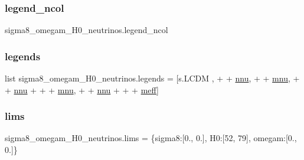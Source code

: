 \subsubsection{\texorpdfstring{legend\+\_\+ncol}{legend\_ncol}}
{\footnotesize\ttfamily sigma8\+\_\+omegam\+\_\+\+H0\+\_\+neutrinos.\+legend\+\_\+ncol}

\mbox{\label{namespacesigma8__omegam__H0__neutrinos_aea361e871a0ef6fe21cd7907ba18a4e9}} 
\subsubsection{\texorpdfstring{legends}{legends}}
{\footnotesize\ttfamily list sigma8\+\_\+omegam\+\_\+\+H0\+\_\+neutrinos.\+legends = \mbox{[}s.\+L\+C\+DM , \textquotesingle{}+\textquotesingle{} + \mbox{\hyperlink{namespacesigma8__omegam__H0__neutrinos_acb935efeda9daade15f08c15a961ef21}{nnu}}, \textquotesingle{}+\textquotesingle{} + \mbox{\hyperlink{namespacesigma8__omegam__H0__neutrinos_af5508f23be264b167a81bc0ded5fef41}{mnu}}, \textquotesingle{}+\textquotesingle{} + \mbox{\hyperlink{namespacesigma8__omegam__H0__neutrinos_acb935efeda9daade15f08c15a961ef21}{nnu}} + \textquotesingle{}+\textquotesingle{} + \mbox{\hyperlink{namespacesigma8__omegam__H0__neutrinos_af5508f23be264b167a81bc0ded5fef41}{mnu}}, \textquotesingle{}+\textquotesingle{} + \mbox{\hyperlink{namespacesigma8__omegam__H0__neutrinos_acb935efeda9daade15f08c15a961ef21}{nnu}} + \textquotesingle{}+\textquotesingle{} + \mbox{\hyperlink{namespacesigma8__omegam__H0__neutrinos_a6143ce5b5f4d1e4aeb72af0e1d0c1fff}{meff}}\mbox{]}}

\mbox{\label{namespacesigma8__omegam__H0__neutrinos_a70f3238faf5becd1f2cdea437f20b19e}} 
\subsubsection{\texorpdfstring{lims}{lims}}
{\footnotesize\ttfamily sigma8\+\_\+omegam\+\_\+\+H0\+\_\+neutrinos.\+lims = \{\textquotesingle{}sigma8\textquotesingle{}\+:\mbox{[}0., 0.\mbox{]}, \textquotesingle{}H0\textquotesingle{}\+:\mbox{[}52, 79\mbox{]}, \textquotesingle{}omegam\textquotesingle{}\+:\mbox{[}0., 0.\mbox{]}\}}


